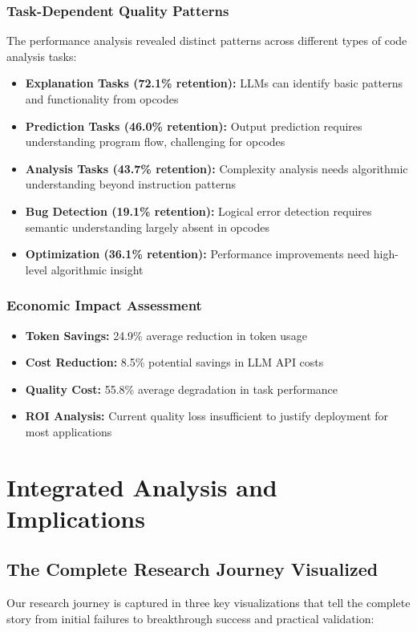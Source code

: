 \documentclass[11pt,a4paper]{article}
\begin{document}
\subsubsection{Task-Dependent Quality Patterns}
The performance analysis revealed distinct patterns across different types of code analysis tasks:

\begin{itemize}
    \item \textbf{Explanation Tasks (72.1\% retention):} LLMs can identify basic patterns and functionality from opcodes
    \item \textbf{Prediction Tasks (46.0\% retention):} Output prediction requires understanding program flow, challenging for opcodes
    \item \textbf{Analysis Tasks (43.7\% retention):} Complexity analysis needs algorithmic understanding beyond instruction patterns
    \item \textbf{Bug Detection (19.1\% retention):} Logical error detection requires semantic understanding largely absent in opcodes
    \item \textbf{Optimization (36.1\% retention):} Performance improvements need high-level algorithmic insight
\end{itemize}

\subsubsection{Economic Impact Assessment}
\begin{itemize}
    \item \textbf{Token Savings:} 24.9\% average reduction in token usage
    \item \textbf{Cost Reduction:} 8.5\% potential savings in LLM API costs
    \item \textbf{Quality Cost:} 55.8\% average degradation in task performance
    \item \textbf{ROI Analysis:} Current quality loss insufficient to justify deployment for most applications
\end{itemize}

\section{Integrated Analysis and Implications}

\subsection{The Complete Research Journey Visualized}
Our research journey is captured in three key visualizations that tell the complete story from initial failures to breakthrough success and practical validation:
\end{document}
